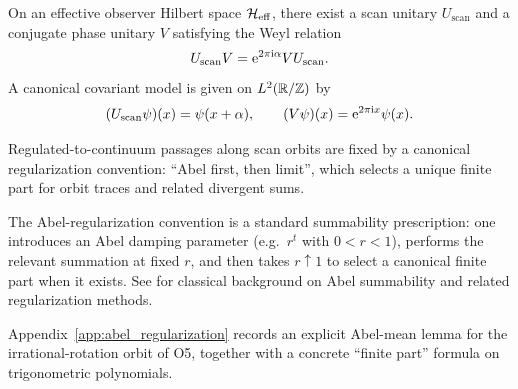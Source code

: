 \begin{axiom}
On an effective observer Hilbert space $\mathcal{H}_{\mathrm{eff}}$, there exist a scan unitary $U_{\mathrm{scan}}$ and a conjugate phase unitary $V$ satisfying the Weyl relation
\begin{equation}
U_{\mathrm{scan}} V = \mathrm{e}^{2\pi \mathrm{i} \alpha} V U_{\mathrm{scan}}.
\end{equation}
A canonical covariant model is given on $L^2(\mathbb{R}/\mathbb{Z})$ by
\begin{equation}
(U_{\mathrm{scan}}\psi)(x)=\psi(x+\alpha),\qquad (V\psi)(x)=\mathrm{e}^{2\pi \mathrm{i} x}\psi(x).
\end{equation}
\end{axiom}

\begin{assumption}
Regulated-to-continuum passages along scan orbits are fixed by a canonical regularization convention: ``Abel first, then limit'', which selects a unique finite part for orbit traces and related divergent sums.
\end{assumption}
\begin{remark}
The Abel-regularization convention is a standard summability prescription: one introduces an Abel damping parameter (e.g.\ $r^t$ with $0<r<1$), performs the relevant summation at fixed $r$, and then takes $r\uparrow 1$ to select a canonical finite part when it exists. See \cite{Hardy1949} for classical background on Abel summability and related regularization methods.
\end{remark}
\begin{remark}
Appendix~\ref{app:abel_regularization} records an explicit Abel-mean lemma for the irrational-rotation orbit of O5, together with a concrete ``finite part'' formula on trigonometric polynomials.
\end{remark}

